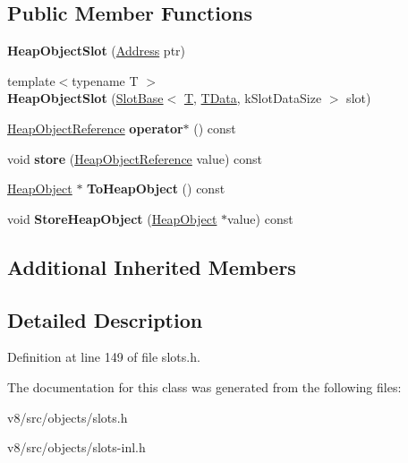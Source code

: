 \subsection*{Public Member Functions}
\begin{DoxyCompactItemize}
\item 
\mbox{\label{classv8_1_1internal_1_1HeapObjectSlot_ad3e1a945a889ec23ee93b3e2639bec35}} 
{\bfseries Heap\+Object\+Slot} (\mbox{\hyperlink{classuintptr__t}{Address}} ptr)
\item 
\mbox{\label{classv8_1_1internal_1_1HeapObjectSlot_a7e14792d31e3737f58f4e2895ff25433}} 
{\footnotesize template$<$typename T $>$ }\\{\bfseries Heap\+Object\+Slot} (\mbox{\hyperlink{classv8_1_1internal_1_1SlotBase}{Slot\+Base}}$<$ \mbox{\hyperlink{classv8_1_1internal_1_1torque_1_1T}{T}}, \mbox{\hyperlink{classuintptr__t}{T\+Data}}, k\+Slot\+Data\+Size $>$ slot)
\item 
\mbox{\label{classv8_1_1internal_1_1HeapObjectSlot_a286a53227d1d4c8788995b67ffd53282}} 
\mbox{\hyperlink{classv8_1_1internal_1_1HeapObjectReference}{Heap\+Object\+Reference}} {\bfseries operator$\ast$} () const
\item 
\mbox{\label{classv8_1_1internal_1_1HeapObjectSlot_ae86719e7ccb4aa84a83d78fae6f226ae}} 
void {\bfseries store} (\mbox{\hyperlink{classv8_1_1internal_1_1HeapObjectReference}{Heap\+Object\+Reference}} value) const
\item 
\mbox{\label{classv8_1_1internal_1_1HeapObjectSlot_a5fb8ae62a0802f2ee80727edaae7b082}} 
\mbox{\hyperlink{classv8_1_1internal_1_1HeapObject}{Heap\+Object}} $\ast$ {\bfseries To\+Heap\+Object} () const
\item 
\mbox{\label{classv8_1_1internal_1_1HeapObjectSlot_ad5f18079c32a7cdc0ac358d124f9d3dd}} 
void {\bfseries Store\+Heap\+Object} (\mbox{\hyperlink{classv8_1_1internal_1_1HeapObject}{Heap\+Object}} $\ast$value) const
\end{DoxyCompactItemize}
\subsection*{Additional Inherited Members}


\subsection{Detailed Description}


Definition at line 149 of file slots.\+h.



The documentation for this class was generated from the following files\+:\begin{DoxyCompactItemize}
\item 
v8/src/objects/slots.\+h\item 
v8/src/objects/slots-\/inl.\+h\end{DoxyCompactItemize}
